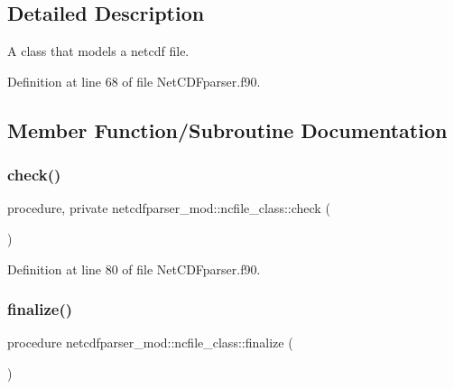 \subsection{Detailed Description}
A class that models a netcdf file. 

Definition at line 68 of file Net\+C\+D\+Fparser.\+f90.



\subsection{Member Function/\+Subroutine Documentation}
\mbox{\label{structnetcdfparser__mod_1_1ncfile__class_a2b41dc377688a881f9252bd4fc09bec9}} 
\subsubsection{\texorpdfstring{check()}{check()}}
{\footnotesize\ttfamily procedure, private netcdfparser\+\_\+mod\+::ncfile\+\_\+class\+::check (\begin{DoxyParamCaption}{ }\end{DoxyParamCaption})\hspace{0.3cm}{\ttfamily [private]}}



Definition at line 80 of file Net\+C\+D\+Fparser.\+f90.

\mbox{\label{structnetcdfparser__mod_1_1ncfile__class_a62c3404b0742346374753743e349e6f1}} 
\subsubsection{\texorpdfstring{finalize()}{finalize()}}
{\footnotesize\ttfamily procedure netcdfparser\+\_\+mod\+::ncfile\+\_\+class\+::finalize (\begin{DoxyParamCaption}{ }\end{DoxyParamCaption})\hspace{0.3cm}{\ttfamily [private]}}



